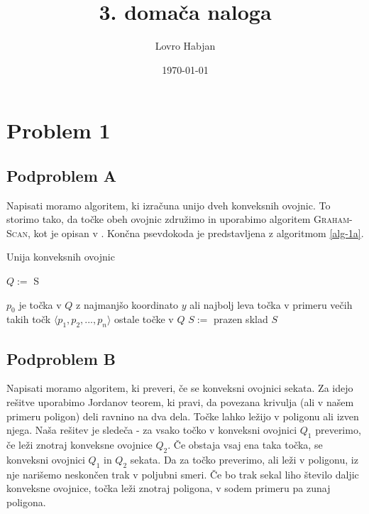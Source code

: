 \documentclass{article}
\title{3. domača naloga}
\author{Lovro Habjan}
\date{\today}
\begin{document}
\maketitle

\section{Problem 1}

\subsection{Podproblem A}

Napisati moramo algoritem, ki izračuna unijo dveh konveksnih ovojnic. To storimo
tako, da točke obeh ovojnic združimo in uporabimo algoritem
\textsc{Graham-Scan}, kot je opisan v \cite{cormen2009introduction}. Končna
psevdokoda je predstavljena z algoritmom \ref{alg-1a}.

\begin{algorithm}
	\caption{Unija konveksnih ovojnic}
	\label{alg-1a}

	\begin{algorithmic}[1]
			\State $Q := $ 
			\State \Return {}S
		\EndFunction

		\Statex

			\State $p_0$ je točka v $Q$ z najmanjšo koordinato $y$ ali najbolj
				leva točka v primeru večih takih točk
			\State $\langle p_1, p_2, ..., p_n \rangle$ ostale točke v $Q$
			\State $S := $ prazen sklad
			\State {}
			\State {}
			\State {}
					\State {}
				\EndWhile
				\State {}
			\EndFor
			\State \Return $S$
		\EndFunction
	\end{algorithmic}
\end{algorithm}


\subsection{Podproblem B}

Napisati moramo algoritem, ki preveri, če se konveksni ovojnici sekata. Za idejo
rešitve uporabimo Jordanov teorem, ki pravi, da povezana krivulja (ali v našem
primeru poligon) deli ravnino na dva dela. Točke lahko ležijo v poligonu ali
izven njega. Naša rešitev je sledeča - za vsako točko v konveksni ovojnici $Q_1$
preverimo, če leži znotraj konveksne ovojnice $Q_2$. Če obstaja vsaj ena taka
točka, se konveksni ovojnici $Q_1$ in $Q_2$ sekata. Da za točko preverimo, ali
leži v poligonu, iz nje narišemo neskončen trak v poljubni smeri. Če bo trak
sekal liho število daljic konveksne ovojnice, točka leži znotraj poligona, v
sodem primeru pa zunaj poligona.
\end{document}
